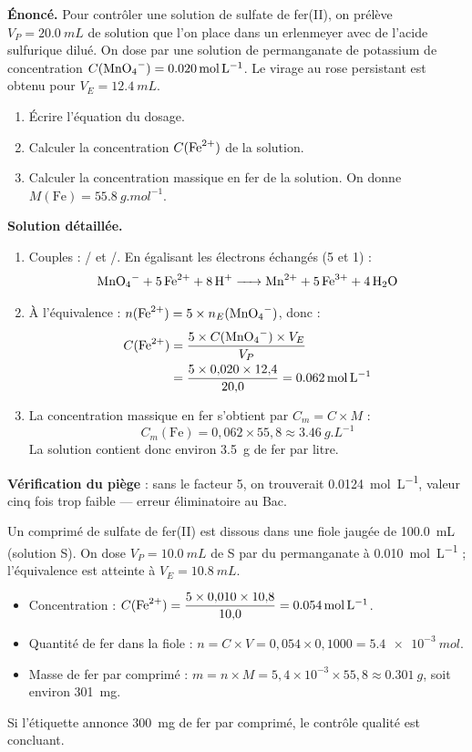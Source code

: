\documentclass[11pt]{article}
\begin{document}
\begin{exoresolu}
\textbf{Énoncé.} Pour contrôler une solution de sulfate de fer(II), on prélève $V_P = \SI{20,0}{mL}$ de solution que l'on place dans un erlenmeyer avec de l'acide sulfurique dilué. On dose par une solution de permanganate de potassium de concentration $C(\ce{MnO4-}) = \SI{0,020}{mol.L^{-1}}$. Le virage au rose persistant est obtenu pour $V_E = \SI{12,4}{mL}$.
\begin{enumerate}
\item Écrire l'équation du dosage.
\item Calculer la concentration $C(\ce{Fe^2+})$ de la solution.
\item Calculer la concentration massique en fer de la solution. On donne $M(\text{Fe}) = \SI{55,8}{g.mol^{-1}}$.
\end{enumerate}
\tcblower
\textbf{Solution détaillée.}
\begin{enumerate}
\item Couples : / et /. En égalisant les électrons échangés (5 et 1) :
\[ \ce{MnO4- + 5Fe^2+ + 8H+ -> Mn^2+ + 5Fe^3+ + 4H2O} \]
\item À l'équivalence : $n(\ce{Fe^2+}) = 5 \times n_E(\ce{MnO4-})$, donc :
\begin{align*}
C(\ce{Fe^2+}) &= \dfrac{5 \times C(\ce{MnO4-}) \times V_E}{V_P} \\
&= \dfrac{5 \times 0{,}020 \times 12{,}4}{20{,}0} = \SI{0,062}{mol.L^{-1}}
\end{align*}
\item La concentration massique en fer s'obtient par $C_m = C \times M$ :
\[ C_m(\text{Fe}) = 0{,}062 \times 55{,}8 \approx \SI{3,46}{g.L^{-1}} \]
La solution contient donc environ \SI{3,5}{g} de fer par litre.
\end{enumerate}
\textbf{Vérification du piège} : sans le facteur 5, on trouverait \SI{0,0124}{mol.L^{-1}}, valeur cinq fois trop faible — erreur éliminatoire au Bac.
\end{exoresolu}

\begin{exemplebox}
Un comprimé de sulfate de fer(II) est dissous dans une fiole jaugée de \SI{100,0}{mL} (solution S). On dose $V_P = \SI{10,0}{mL}$ de S par du permanganate à \SI{0,010}{mol.L^{-1}} ; l'équivalence est atteinte à $V_E = \SI{10,8}{mL}$.
\begin{itemize}
\item Concentration : $C(\ce{Fe^2+}) = \dfrac{5 \times 0{,}010 \times 10{,}8}{10{,}0} = \SI{0,054}{mol.L^{-1}}$.
\item Quantité de fer dans la fiole : $n = C \times V = 0{,}054 \times 0{,}1000 = \SI{5,4e-3}{mol}$.
\item Masse de fer par comprimé : $m = n \times M = 5{,}4 \times 10^{-3} \times 55{,}8 \approx \SI{0,301}{g}$, soit environ \SI{301}{mg}.
\end{itemize}
Si l'étiquette annonce \SI{300}{mg} de fer par comprimé, le contrôle qualité est concluant.
\end{exemplebox}
\end{document}
